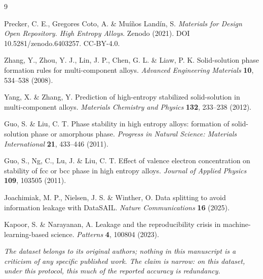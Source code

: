 \documentclass[11pt]{article}
\begin{document}
\begin{thebibliography}{9}

Precker, C. E., Gregores Coto, A. \& Mu\'i\~nos Land\'in, S.
\emph{Materials for Design Open Repository. High Entropy Alloys}.
Zenodo (2021). DOI 10.5281/zenodo.6403257. CC-BY-4.0.

Zhang, Y., Zhou, Y. J., Lin, J. P., Chen, G. L. \& Liaw, P. K.
Solid-solution phase formation rules for multi-component alloys.
\emph{Advanced Engineering Materials} \textbf{10}, 534--538 (2008).

Yang, X. \& Zhang, Y.
Prediction of high-entropy stabilized solid-solution in multi-component alloys.
\emph{Materials Chemistry and Physics} \textbf{132}, 233--238 (2012).

Guo, S. \& Liu, C. T.
Phase stability in high entropy alloys: formation of solid-solution phase or amorphous phase.
\emph{Progress in Natural Science: Materials International} \textbf{21}, 433--446 (2011).

Guo, S., Ng, C., Lu, J. \& Liu, C. T.
Effect of valence electron concentration on stability of fcc or bcc phase in high entropy alloys.
\emph{Journal of Applied Physics} \textbf{109}, 103505 (2011).

Joachimiak, M. P., Nielsen, J. S. \& Winther, O.
Data splitting to avoid information leakage with DataSAIL.
\emph{Nature Communications} \textbf{16} (2025).

Kapoor, S. \& Narayanan, A.
Leakage and the reproducibility crisis in machine-learning-based science.
\emph{Patterns} \textbf{4}, 100804 (2023).

\end{thebibliography}

\vspace{1em}
\noindent\small\itshape
The dataset belongs to its original authors; nothing in this manuscript is a criticism of any specific published work. The claim is narrow: on this dataset, under this protocol, this much of the reported accuracy is redundancy.
\end{document}
